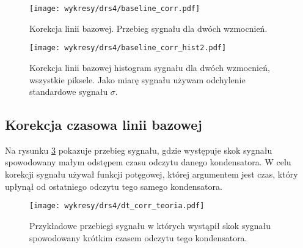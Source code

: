 \documentclass[a4paper,11pt,twoside]{article}
\begin{document}
\begin{figure}[H] 
\centering
\texttt{[image: wykresy/drs4/baseline\_corr.pdf]}
\caption{Korekcja linii bazowej. Przebieg sygnału dla dwóch wzmocnień.}
\label{fig:baseline_corr}
\end{figure}

\begin{figure}[H] 
\centering
\texttt{[image: wykresy/drs4/baseline\_corr\_hist2.pdf]}
\caption{Korekcja linii bazowej histogram sygnału dla dwóch wzmocnień, wszystkie piksele. Jako miarę sygnału używam odchylenie standardowe sygnału $\sigma$.}
\label{fig:baseline_corr_hist}
\end{figure}

\newpage
\subsection{Korekcja czasowa linii bazowej}
Na rysunku \ref{fig:dt_corr_Waveform} pokazuje przebieg sygnału, gdzie występuje skok sygnału spowodowany małym odstępem czasu odczytu danego kondensatora. W celu korekcji sygnału używał funkcji potęgowej, której argumentem jest czas, który upłynął od ostatniego odczytu tego samego kondensatora.  
\begin{figure}[H] 
\centering
\texttt{[image: wykresy/drs4/dt\_corr\_teoria.pdf]}
\caption{Przykładowe przebiegi sygnału w których wystąpił skok sygnału spowodowany krótkim czasem odczytu tego kondensatora.}
\label{fig:dt_corr_Waveform}
\end{figure}
\end{document}
